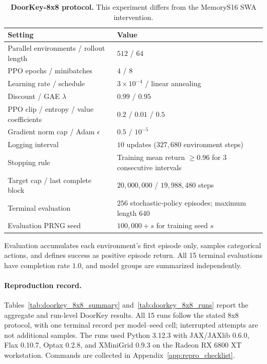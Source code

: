 \begin{table}[H]
\centering\small
\caption{\textbf{DoorKey-8x8 protocol.} This experiment differs from the MemoryS16 SWA intervention.}
\label{tab:doorkey_8x8_protocol}
\begin{tabular}{ll}
\toprule
Setting & Value \\
\midrule
Parallel environments / rollout length & $512$ / $64$ \\
PPO epochs / minibatches & $4$ / $8$ \\
Learning rate / schedule & $3\times10^{-4}$ / linear annealing \\
Discount / GAE $\lambda$ & $0.99$ / $0.95$ \\
PPO clip / entropy / value coefficients & $0.2$ / $0.01$ / $0.5$ \\
Gradient norm cap / Adam $\epsilon$ & $0.5$ / $10^{-5}$ \\
Logging interval & $10$ updates ($327{,}680$ environment steps) \\
Stopping rule & Training mean return $\geq0.96$ for $3$ consecutive intervals \\
Target cap / last complete block & $20{,}000{,}000$ / $19{,}988{,}480$ steps \\
Terminal evaluation & $256$ stochastic-policy episodes; maximum length $640$ \\
Evaluation PRNG seed & $100{,}000+s$ for training seed $s$ \\
\bottomrule
\end{tabular}
\end{table}

Evaluation accumulates each environment's first episode only, samples categorical actions, and defines success as positive episode return. All 15 terminal evaluations have completion rate $1.0$, and model groups are summarized independently.

\begin{table}[H]
\centering\footnotesize
\setlength{\tabcolsep}{4pt}
\caption{\textbf{DoorKey-8x8 run-level results.} Every row corresponds to one terminal evaluation. Steps are rounded to five decimal places in millions.}
\label{tab:doorkey_8x8_runs}

\end{table}

\paragraph{Reproduction record.}
Tables~\ref{tab:doorkey_8x8_summary} and~\ref{tab:doorkey_8x8_runs} report the aggregate and run-level DoorKey results. All 15 runs follow the stated 8x8 protocol, with one terminal record per model--seed cell; interrupted attempts are not additional samples. The runs used Python 3.12.3 with JAX/JAXlib 0.6.0, Flax 0.10.7, Optax 0.2.8, and XMiniGrid 0.9.3 on the Radeon RX 6800 XT workstation. Commands are collected in Appendix~\ref{app:repro_checklist}.

